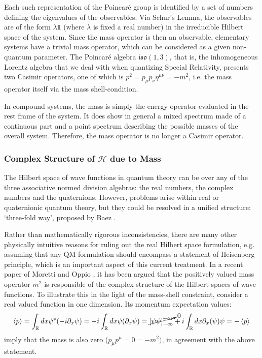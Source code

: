 \documentclass[twoside,a4paper,11pt]{article}
\numberwithin{equation}{section}
\begin{document}
Each such representation of the Poincaré group is identified by a set of numbers defining the eigenvalues of the observables. Via Schur's Lemma, the observables are of the form $\lambda \mathds{1}$ (where $\lambda$ is fixed a real number) in the irreducible Hilbert space of the system. Since the mass operator is then an observable, elementary systems have a trivial mass operator, which can be considered as a given non-quantum parameter. The Poincaré algebra $\mathfrak{iso}(1,3)$, that is, the inhomogeneous Lorentz algebra that we deal with when quantizing Special Relativity, presents two Casimir operators, one of which is $p^2 = p_\mu p_\nu \eta^{\mu\nu} = - m^2$, i.e. the mass operator itself via the mass shell-condition.




In compound systems, the mass is simply the energy operator evaluated in the rest frame of the system. It does show in general a mixed spectrum made of a continuous part and a point spectrum describing the possible masses of the overall system. Therefore, the mass operator is no longer a Casimir operator.

\subsubsection{Complex Structure of $\mathcal{H}$ due to Mass }
The Hilbert space of wave functions in quantum theory can be over any of the three associative normed division algebras: the real numbers, the complex numbers and the quaternions. However, problems arise within real or quaternionic quantum theory, but they could be resolved in a unified structure: ‘three-fold way’, proposed by Baez \cite {Baez}.

Rather than mathematically rigorous inconsistencies, there are many other physically intuitive reasons for ruling out the real Hilbert space formulation, e.g. assuming that any QM formulation should encompass a statement of Heisenberg principle, which is an important aspect of this current treatment. In a recent paper of Moretti and Oppio \cite{MassGivingComplexStructure}, it has been argued that the positively valued  mass operator $m^2$ is responsible of the complex structure of the Hilbert spaces of wave functions. To illustrate this in the light of the mass-shell constraint, consider a real valued function in one dimension. Its momentum expectation values:
\begin{equation}
\braket{p} = \int_{\mathbb{R}} dx \psi^* (-i \partial_x \psi) = -i \int_{\mathbb{R}} dx \psi (\partial_x \psi) = \cancelto{0}{\left[\psi  \psi \right]_{-\infty}^{+\infty}} + i \int_{\mathbb{R}} dx \partial_x (\psi)  \psi = - \braket{p}
\end{equation}
imply that the mass is also zero ($p_\mu p^\mu = 0 =-m^2)$, in agreement with the above statement.
\end{document}

